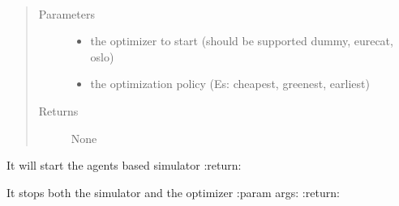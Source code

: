 \documentclass[letterpaper,10pt,english]{sphinxmanual}
\begin{document}
\begin{fulllineitems}
\label{\detokenize{index:simulator.start_optimizer}}~\begin{quote}\begin{description}
\item[{Parameters}] \leavevmode\begin{itemize}
\item {} 
 \textendash{} the optimizer to start (should be supported dummy, eurecat, oslo)

\item {} 
 \textendash{} the optimization policy (Es: cheapest, greenest, earliest)

\end{itemize}

\item[{Returns}] \leavevmode
None

\end{description}\end{quote}

\end{fulllineitems}


\begin{fulllineitems}
\label{\detokenize{index:simulator.start_simulator}}
It will start the agents based simulator
:return:

\end{fulllineitems}


\begin{fulllineitems}
\label{\detokenize{index:simulator.stop}}
It stops both the simulator and the optimizer
:param args:
:return:

\end{fulllineitems}
\end{document}
